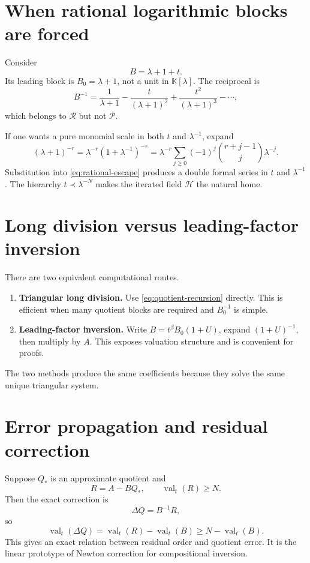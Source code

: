 \documentclass[11pt,openany]{book}
\theoremstyle{definition}
\theoremstyle{plain}
\theoremstyle{remark}
\newcommand{\K}{\mathbb{K}}
\newcommand{\Plog}{\mathscr{P}}
\newcommand{\Rlog}{\mathscr{R}}
\newcommand{\Hlog}{\mathscr{H}}
\newcommand{\precdom}{\prec}
\DeclareMathOperator{\val}{val}
\begin{document}
\section{When rational logarithmic blocks are forced}
Consider
\[
 B=\lambda+1+t.
\]
Its leading block is \(B_0=\lambda+1\), not a unit in \(\K[\lambda]\). The reciprocal is
\begin{equation}\label{eq:rational-escape}
 B^{-1}
 =\frac1{\lambda+1}
 -\frac{t}{(\lambda+1)^2}
 +\frac{t^2}{(\lambda+1)^3}-\cdots,
\end{equation}
which belongs to \(\Rlog\) but not \(\Plog\).

If one wants a pure monomial scale in both \(t\) and \(\lambda^{-1}\), expand
\[
 (\lambda+1)^{-r}
 =\lambda^{-r}(1+\lambda^{-1})^{-r}
 =\lambda^{-r}\sum_{j\ge0}(-1)^j
 \binom{r+j-1}{j}\lambda^{-j}.
\]
Substitution into \cref{eq:rational-escape} produces a double formal series in \(t\) and \(\lambda^{-1}\). The hierarchy \(t\precdom\lambda^{-N}\) makes the iterated field \(\Hlog\) the natural home.

\section{Long division versus leading-factor inversion}
There are two equivalent computational routes.

\begin{enumerate}
\item \textbf{Triangular long division.} Use \cref{eq:quotient-recursion} directly. This is efficient when many quotient blocks are required and \(B_0^{-1}\) is simple.
\item \textbf{Leading-factor inversion.} Write \(B=t^\beta B_0(1+U)\), expand \((1+U)^{-1}\), then multiply by \(A\). This exposes valuation structure and is convenient for proofs.
\end{enumerate}

The two methods produce the same coefficients because they solve the same unique triangular system.

\section{Error propagation and residual correction}
Suppose \(Q_*\) is an approximate quotient and
\[
 R=A-BQ_*,\qquad \val_t(R)\ge N.
\]
Then the exact correction is
\begin{equation}\label{eq:quotient-correction}
 \Delta Q=B^{-1}R,
\end{equation}
so
\[
 \val_t(\Delta Q)=\val_t(R)-\val_t(B)
 \ge N-\val_t(B).
\]
This gives an exact relation between residual order and quotient error. It is the linear prototype of Newton correction for compositional inversion.
\end{document}
